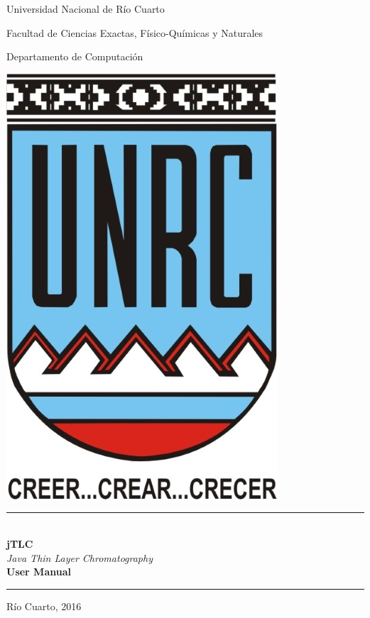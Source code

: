 \documentclass[12pt]{report}
\begin{document}
	\begin{titlepage}
		\begin{center}
			{\huge Universidad Nacional de R\'io Cuarto}\vspace{.2cm}
			
			{\large  Facultad de Ciencias Exactas, F\'isico-Qu\'imicas y Naturales}\vspace{.2cm}
			
			{\Large  Departamento de Computaci\'on}\vspace{.5cm}
			
			\includegraphics{imagenes/escudo}\vspace{1cm}
			
			\rule{13cm}{.01cm} \vspace{.5cm}\\
			{\LARGE \textbf{jTLC}}\\
			\vspace{.25cm}
			{\textit{\LARGE{Java Thin Layer Chromatography}}}\\
			\vspace{1cm}			
			{\large \textbf{User Manual}}
			\rule{13cm}{.01cm} \vspace{1cm}

			

			
			\vspace{4cm}			
			{\large R\'io Cuarto, 2016}
			\end{center}
	\end{titlepage}

\setcounter{tocdepth}{4}
\setcounter{secnumdepth}{4}
\setlength{\cftbeforetoctitleskip}{-2.5em}
\tableofcontents	

\end{document}
